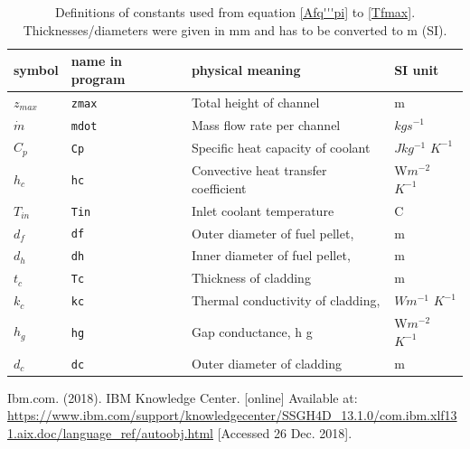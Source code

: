 \documentclass[a4paper, 12pt]{article}
\begin{document}
\begin{appendices}
\begin{center}
\begin{table}[h!b]
\begin{tabular}{llll}
\hline
symbol&name in program&physical meaning & SI unit\\
\hline
$z_{max}$&\texttt{zmax}&Total height of channel 				&m\\
$\dot{m}$&\texttt{mdot}&Mass flow rate per channel 		&$kgs^{-1}$ \\
$C_p$	&\texttt{Cp}&Specific heat capacity of coolant 		&$Jkg^{-1}$ $K^{-1}$ \\
$h_c$	&\texttt{hc}&Convective heat transfer coefficient&W$m^{-2}$ $K^{-1}$ \\
$T_{in}$&\texttt{Tin}&Inlet coolant temperature 			& \textdegree C\\
\hline
$d_f$	&\texttt{df}&Outer diameter of fuel pellet, &m\\
$d_h$	&\texttt{dh}&Inner diameter of fuel pellet, &m\\
\hline
$t_c$	&\texttt{Tc}&Thickness of cladding &m\\
$k_c$	&\texttt{kc}&Thermal conductivity of cladding,  &$Wm^{-1}$ $K^{-1}$ \\
$h_g$	&\texttt{hg}&Gap conductance, h g &W$m^{-2}$ $K^{-1}$ \\
\hline
$d_c$	&\texttt{dc}&Outer diameter of cladding&m\\
\hline

\end{tabular}
\caption{Definitions of constants used from equation \ref{Afq'''pi} to \ref{Tfmax}.   Thicknesses/diameters were given in mm and has to be converted to m (SI).}\label{table2}
\end{table}
\end{center}

\end{appendices}

\begin{thebibliography}{1}
Ibm.com. (2018). IBM Knowledge Center. [online] Available at: \url{https://www.ibm.com/support/knowledgecenter/SSGH4D_13.1.0/com.ibm.xlf131.aix.doc/language_ref/autoobj.html} [Accessed 26 Dec. 2018].
\end  {thebibliography}

\end{document}
